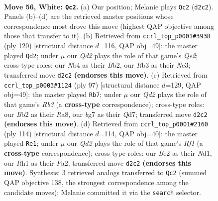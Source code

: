 \documentclass[11pt]{article}
\begin{document}
\clearpage

\begin{figure}[p]\centering
\begin{subfigure}{0.46\textwidth}\centering
\resizebox{\linewidth}{!}{%
\newchessgame
\chessboard[
  setfen={rn1qk2r/4n1b1/6p1/3p2P1/1N1P1P1p/1R5P/1B1QBK2/7R w - - 1 56},
  showmover=false,
  pgfstyle=straightmove, color=movearrow, markmove={d2-c2}
]}
\caption{}
\end{subfigure}\hfill
\begin{subfigure}{0.46\textwidth}\centering
\resizebox{\linewidth}{!}{%
\newchessgame
\chessboard[
  setfen={4r1k1/1bqn1p2/1p2n1p1/1P2p2p/2P4P/R3NPP1/1B2Q1B1/6K1 w - - 4 61},
  showmover=false,
  pgfstyle=straightmove, color=movearrow, markmove={e2-d2}
]}
\caption{}
\end{subfigure}
\\[4pt]
\begin{subfigure}{0.46\textwidth}\centering
\resizebox{\linewidth}{!}{%
\newchessgame
\chessboard[
  setfen={r7/3q2bk/nr1p2p1/1p1Pp1Pp/4P3/P2N1Q1P/2R2NK1/1R6 b - - 1 49},
  showmover=false,
  pgfstyle=straightmove, color=movearrow, markmove={b6-b7}
]}
\caption{}
\end{subfigure}\hfill
\begin{subfigure}{0.46\textwidth}\centering
\resizebox{\linewidth}{!}{%
\newchessgame
\chessboard[
  setfen={6k1/pb3qp1/3br3/2p4P/2PpnP2/1P6/P1Q3BP/2BN1RK1 w - - 1 58},
  showmover=false,
  pgfstyle=straightmove, color=movearrow, markmove={f1-e1}
]}
\caption{}
\end{subfigure}
\caption{\textbf{Move 56, White: \texttt{Qc2}.} (a) Our position; Melanie plays \texttt{Qc2} (\texttt{d2c2}). Panels (b)--(d) are the retrieved master positions whose correspondence most drove this move (highest QAP objective among those that transfer to it). (b) Retrieved from \texttt{ccrl\_top\_p0001\#3938} (ply 120) [structural distance $d$=116, QAP obj=49]: the master played \texttt{Qd2}; under $\mu$ our \emph{Qd2} plays the role of that game's \emph{Qe2}; cross-type roles: our \emph{N}b4 as their \emph{B}b2, our \emph{R}b3 as their \emph{N}e3; transferred move \texttt{d2c2} \textbf{(endorses this move)}. (c) Retrieved from \texttt{ccrl\_top\_p0003\#1124} (ply 97) [structural distance $d$=129, QAP obj=49]: the master played \texttt{Rb7}; under $\mu$ our \emph{Qd2} plays the role of that game's \emph{Rb3} (a \textbf{cross-type} correspondence); cross-type roles: our \emph{B}b2 as their \emph{R}a8, our \emph{b}g7 as their \emph{Q}d7; transferred move \texttt{d2c2} \textbf{(endorses this move)}. (d) Retrieved from \texttt{ccrl\_top\_p0001\#2160} (ply 114) [structural distance $d$=114, QAP obj=40]: the master played \texttt{Re1}; under $\mu$ our \emph{Qd2} plays the role of that game's \emph{Rf1} (a \textbf{cross-type} correspondence); cross-type roles: our \emph{B}e2 as their \emph{N}d1, our \emph{R}h1 as their \emph{P}a2; transferred move \texttt{d2c2} \textbf{(endorses this move)}. Synthesis: 3 retrieved analogs transferred to \texttt{Qc2} (summed QAP objective 138, the strongest correspondence among the candidate moves); Melanie committed it via the \texttt{search} selector.}
\label{fig:thought-m110}
\end{figure}
\end{document}
